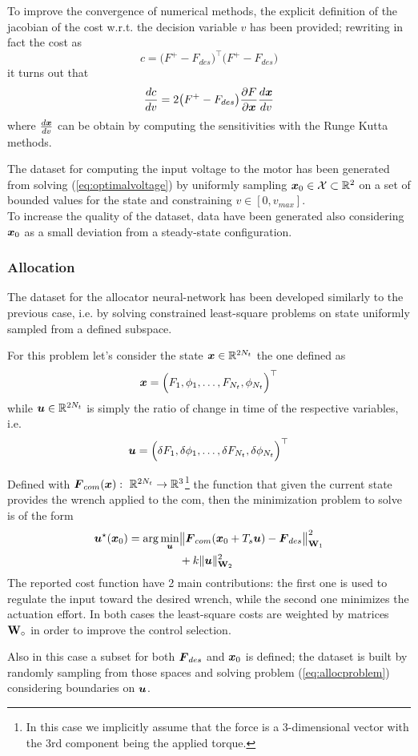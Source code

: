 To improve the convergence of numerical methods, the explicit definition of the jacobian of the cost w.r.t. the decision variable $v$ has been provided; rewriting in fact the cost as
\[ c = \big(F^{+} - F_{des}\big)^{\top} \big(F^{+} - F_{des}\big)\]
it turns out that
\[ \frac{dc}{dv} = 2 \big(F^{+} - F_{des}\big) \frac{\partial F}{\partial\boldsymbol{x}} \frac{d\boldsymbol{x}}{dv} \]
where $\frac{d\boldsymbol{x}}{dv}$ can be obtain by computing the sensitivities with the Runge Kutta methods.

The dataset for computing the input voltage to the motor has been generated from solving (\ref{eq:optimalvoltage}) by uniformly sampling $\boldsymbol{x}_{0} \in \mathcal X \subset \mathbb R^{2}$ on a set of bounded values for the state and constraining $v\in [0,v_{max}]$. \\
To increase the quality of the dataset, data have been generated also considering $\boldsymbol{x}_{0}$ as a small deviation from a steady-state configuration.
\vspace{3mm}

\subsubsection{Allocation}
The dataset for the allocator neural-network has been developed similarly to the previous case, i.e. by solving constrained least-square problems on state uniformly sampled from a defined subspace.

For this problem let's consider the state $\boldsymbol{x} \in \mathbb R^{2N_{t}}$ the one defined as
\[ \boldsymbol{x} = \Big( F_{1}, \phi_{1}, \dots, F_{N_{t}}, \phi_{N_{t}}\Big)^{\top} \]
while $\boldsymbol{u} \in \mathbb R^{2N_{t}}$ is simply the ratio of change in time of the respective variables, i.e.
\[ \boldsymbol{u} = \Big( \delta F_{1}, \delta\phi_{1}, \dots, \delta F_{N_{t}}, \delta\phi_{N_{t}}\Big)^{\top} \]

Defined with $\vett F_{com}(\vett x): \ \mathbb R^{2N_{t}} \rightarrow \mathbb R^{3}$\footnote{In this case we implicitly assume that the force is a 3-dimensional vector with the 3rd component being the applied torque.} the function that given the current state provides the wrench applied to the com, then the minimization problem to solve is of the form
\begin{equation} \label{eq:allocproblem}
\begin{aligned}
    \vett u^{\star} (\vett x_{0}) = \arg \min_{\vett u} & \big\|\vett F_{com}(\vett x_{0} + T_{s}\vett u) - \vett F_{des} \big\|^{2}_{\matt W_{1}} \\ & + k \| \vett u \|^{2}_{\matt W_{2}}
\end{aligned}
\end{equation}
The reported cost function have 2 main contributions: the first one is used to regulate the input toward the desired wrench, while the second one minimizes the actuation effort. In both cases the least-square costs are weighted by matrices $\mathbf{W}_{\circ}$ in order to improve the control selection.

Also in this case a subset for both $\boldsymbol{F}_{des}$ and $\boldsymbol{x}_{0}$ is defined; the dataset is built by randomly sampling from those spaces and solving problem (\ref{eq:allocproblem}) considering boundaries on $\boldsymbol{u}$.
